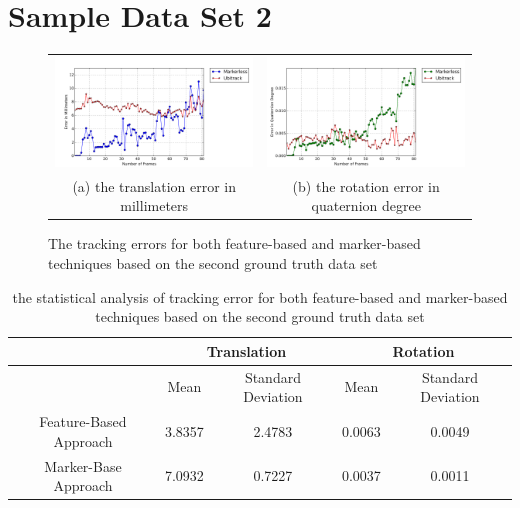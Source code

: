\section{Sample Data Set 2} \label{sec:sample_2}
\begin{figure}[H]
\begin{tabular}{cc}
  \includegraphics[width=80mm]{figures/frame_400/graph_translation} &  \includegraphics[width=80mm]{figures/frame_400/graph_rotation} \\
(a) the translation error in millimeters & (b) the rotation error in quaternion degree \\[6pt]
\end{tabular}
\caption{The tracking errors for both feature-based and marker-based techniques based on the second ground truth data set}\label{fig:sample_02}
\end{figure}

\begin{table}[H]
\centering
  \begin{tabular}{| c || c | c | c | c |}
      \hline
      & \multicolumn{2}{c|}{Translation} & \multicolumn{2}{c|}{Rotation} \\ \hline
       & Mean & Standard Deviation & Mean & Standard Deviation \\ \hline
      Feature-Based Approach & 3.8357 & 2.4783 & 0.0063 & 0.0049 \\ \hline
      Marker-Base Approach & 7.0932 & 0.7227 & 0.0037 & 0.0011 \\ \hline
  \end{tabular}
  \caption{the statistical analysis of tracking error for both feature-based and marker-based techniques based on the second ground truth data set} \label{tab:sample_02}
\end{table}

